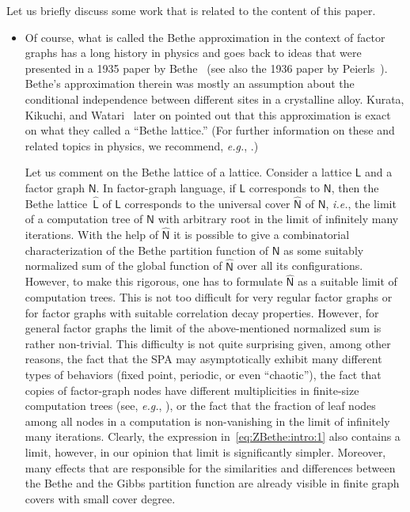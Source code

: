 \documentclass[journal, twocolumn]{IEEEtran}
\newcommand{\eg}{\emph{e.g.}}
\newcommand{\ie}{\emph{i.e.}}
\newcommand{\graph}[1]{\mathsf{#1}}
\newcommand{\graphN}{\graph{N}}
\newcommand{\?}{\mathrm{?}}
\begin{document}
Let us briefly discuss some work that is related to the content of this paper.
\begin{itemize}

\item Of course, what is called the Bethe approximation in the context of
  factor graphs has a long history in physics and goes back to ideas that were
  presented in a 1935 paper by Bethe~\cite{Bethe:35:1} (see also the 1936
  paper by Peierls~\cite{Peierls:36:1}). Bethe's approximation therein was
  mostly an assumption about the conditional independence between different
  sites in a crystalline alloy. Kurata, Kikuchi, and
  Watari~\cite{Kurata:Kikuchi:Watari:53:1} later on pointed out that this
  approximation is exact on what they called a ``Bethe lattice.'' (For further
  information on these and related topics in physics, we recommend, \eg,
  \cite{Eggarter:74:1, Thorpe:82:1, Baxter:82:1}.)

  Let us comment on the Bethe lattice of a lattice. Consider a lattice
  $\graph{L}$ and a factor graph $\graphN$. In factor-graph language, if
  $\graph{L}$ corresponds to $\graphN$, then the Bethe lattice~$\graph{\hat
    L}$ of $\graph{L}$ corresponds to the universal cover $\graph{\hat N}$ of
  $\graphN$, \ie, the limit of a computation tree of $\graphN$ with arbitrary
  root in the limit of infinitely many iterations. With the help of
  $\graph{\hat N}$ it is possible to give a combinatorial characterization of
  the Bethe partition function of $\graphN$ as some suitably normalized sum of
  the global function of $\graph{\hat N}$ over all its
  configurations. However, to make this rigorous, one has to formulate
  $\graph{\hat N}$ as a suitable limit of computation trees. This is not too
  difficult for very regular factor graphs or for factor graphs with suitable
  correlation decay properties. However, for general factor graphs the limit
  of the above-mentioned normalized sum is rather non-trivial. This difficulty
  is not quite surprising given, among other reasons, the fact that the SPA
  may asymptotically exhibit many different types of behaviors (fixed point,
  periodic, or even ``chaotic''), the fact that copies of factor-graph nodes
  have different multiplicities in finite-size computation trees (see, \eg,
  \cite{Frey:Koetter:Vardy:01:1}), or the fact that the fraction of leaf nodes
  among all nodes in a computation is non-vanishing in the limit of infinitely
  many iterations. Clearly, the expression in~\eqref{eq:ZBethe:intro:1} also
  contains a limit, however, in our opinion that limit is significantly
  simpler. Moreover, many effects that are responsible for the similarities
  and differences between the Bethe and the Gibbs partition function are
  already visible in finite graph covers with small cover degree.


\end{itemize}
\end{document}
